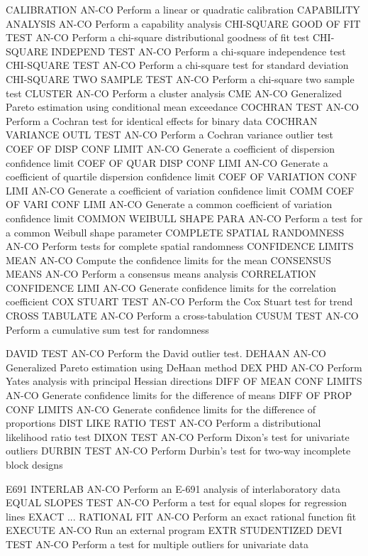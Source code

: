 CALIBRATION                 AN-CO Perform a linear or quadratic calibration
CAPABILITY ANALYSIS         AN-CO Perform a capability analysis
CHI-SQUARE GOOD OF FIT TEST AN-CO Perform a chi-square distributional goodness of fit test
CHI-SQUARE INDEPEND TEST    AN-CO Perform a chi-square independence test
CHI-SQUARE TEST             AN-CO Perform a chi-square test for standard deviation
CHI-SQUARE TWO SAMPLE TEST  AN-CO Perform a chi-square two sample test
CLUSTER                     AN-CO Perform a cluster analysis
CME                         AN-CO Generalized Pareto estimation using conditional mean exceedance
COCHRAN TEST                AN-CO Perform a Cochran test for identical effects for binary data
COCHRAN VARIANCE OUTL TEST  AN-CO Perform a Cochran variance outlier test
COEF OF DISP CONF LIMIT     AN-CO Generate a coefficient of dispersion confidence limit
COEF OF QUAR DISP CONF LIMI AN-CO Generate a coefficient of quartile dispersion confidence limit
COEF OF VARIATION CONF LIMI AN-CO Generate a coefficient of variation confidence limit
COMM COEF OF VARI CONF LIMI AN-CO Generate a common coefficient of variation confidence limit
COMMON WEIBULL SHAPE PARA   AN-CO Perform a test for a common Weibull shape parameter
COMPLETE SPATIAL RANDOMNESS AN-CO Perform tests for complete spatial randomness
CONFIDENCE LIMITS MEAN      AN-CO Compute the confidence limits for the mean
CONSENSUS MEANS             AN-CO Perform a consensus means analysis
CORRELATION CONFIDENCE LIMI AN-CO Generate confidence limits for the correlation coefficient
COX STUART TEST             AN-CO Perform the Cox Stuart test for trend
CROSS TABULATE              AN-CO Perform a cross-tabulation
CUSUM TEST                  AN-CO Perform a cumulative sum test for randomness

DAVID TEST                  AN-CO Perform the David outlier test.
DEHAAN                      AN-CO Generalized Pareto estimation using DeHaan method
DEX PHD                     AN-CO Perform Yates analysis with principal Hessian directions
DIFF OF MEAN CONF LIMITS    AN-CO Generate confidence limits for the difference of means
DIFF OF PROP CONF LIMITS    AN-CO Generate confidence limits for the difference of proportions
DIST LIKE RATIO TEST        AN-CO Perform a distributional likelihood ratio test
DIXON TEST                  AN-CO Perform Dixon's test for univariate outliers
DURBIN TEST                 AN-CO Perform Durbin's test for two-way incomplete block designs

E691 INTERLAB               AN-CO Perform an E-691 analysis of interlaboratory data
EQUAL SLOPES TEST           AN-CO Perform a test for equal slopes for regression lines
EXACT ... RATIONAL FIT      AN-CO Perform an exact rational function fit
EXECUTE                     AN-CO Run an external program
EXTR STUDENTIZED DEVI TEST  AN-CO Perform a test for multiple outliers for univariate data

